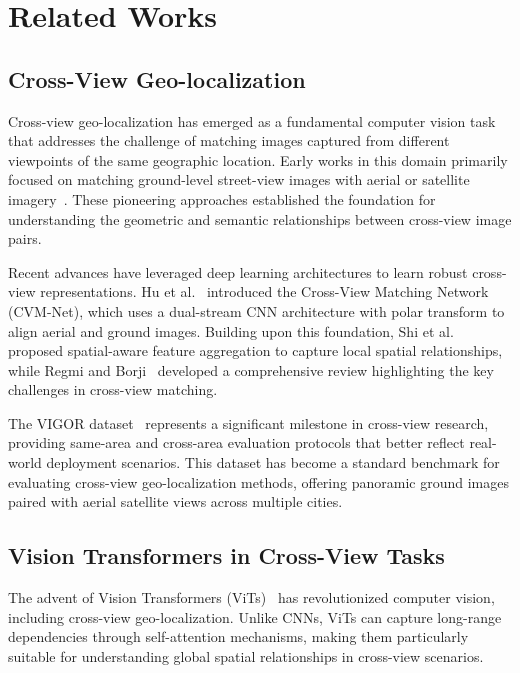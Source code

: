 \section{Related Works}
\label{sec:related_works}

\subsection{Cross-View Geo-localization}

Cross-view geo-localization has emerged as a fundamental computer vision task that addresses the challenge of matching images captured from different viewpoints of the same geographic location. Early works in this domain primarily focused on matching ground-level street-view images with aerial or satellite imagery~\cite{workman2015predicting,lin2013cross}. These pioneering approaches established the foundation for understanding the geometric and semantic relationships between cross-view image pairs.

Recent advances have leveraged deep learning architectures to learn robust cross-view representations. Hu et al.~\cite{hu2018cvm} introduced the Cross-View Matching Network (CVM-Net), which uses a dual-stream CNN architecture with polar transform to align aerial and ground images. Building upon this foundation, Shi et al.~\cite{shi2019spatial} proposed spatial-aware feature aggregation to capture local spatial relationships, while Regmi and Borji~\cite{regmi2018cross} developed a comprehensive review highlighting the key challenges in cross-view matching.

The VIGOR dataset~\cite{zhu2021vigor} represents a significant milestone in cross-view research, providing same-area and cross-area evaluation protocols that better reflect real-world deployment scenarios. This dataset has become a standard benchmark for evaluating cross-view geo-localization methods, offering panoramic ground images paired with aerial satellite views across multiple cities.

\subsection{Vision Transformers in Cross-View Tasks}

The advent of Vision Transformers (ViTs)~\cite{dosovitskiy2020image} has revolutionized computer vision, including cross-view geo-localization. Unlike CNNs, ViTs can capture long-range dependencies through self-attention mechanisms, making them particularly suitable for understanding global spatial relationships in cross-view scenarios.

